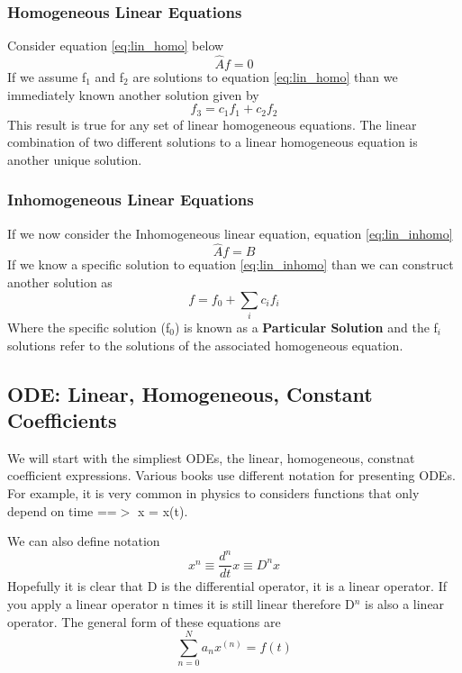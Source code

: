 \documentclass{article}
\newcommand{\be}{\begin{equation}}
\newcommand{\ee}{\end{equation}}
\begin{document}
\subsubsection*{Homogeneous Linear Equations}
Consider equation \ref{eq:lin_homo} below
\be \label{eq:lin_homo}
\hat{A}f = 0
\ee
If we assume f$_1$ and f$_2$ are solutions to equation \ref{eq:lin_homo} than we immediately known another solution given by
\be
f_3 = c_1f_1 + c_2f_2
\ee
This result is true for any set of linear homogeneous equations. 
The linear combination of two different solutions to a linear homogeneous equation is another unique solution. 

\subsubsection*{Inhomogeneous Linear Equations}
If we now consider the Inhomogeneous linear equation, equation \ref{eq:lin_inhomo}
\be \label{eq:lin_inhomo}
\hat{A}f = B
\ee
If we know a specific solution to equation \ref{eq:lin_inhomo} than we can construct another solution as
\be
f = f_0 + \sum_i c_i f_i
\ee
Where the specific solution (f$_0$) is known as a \textbf{Particular Solution} and the f$_i$ solutions refer to the solutions of the associated homogeneous equation. 

\subsection*{ODE: Linear, Homogeneous, Constant Coefficients}
We will start with the simpliest ODEs, the linear, homogeneous, constnat coefficient expressions. 
Various books use different notation for presenting ODEs.
For example, it is very common in physics to considers functions that only depend on time ==$>$ x = x(t). 

We can also define notation 
\be
x^n \equiv \frac{d^n}{dt}x \equiv D^n x
\ee
Hopefully it is clear that D is the differential operator, it is a linear operator.
If you apply a linear operator n times it is still linear therefore D$^n$ is also a linear operator. 
The general form of these equations are
\be \label{eq:lin_cc}
\sum_{n=0}^N a_nx^{(n)} = f(t)
\ee
\end{document}
